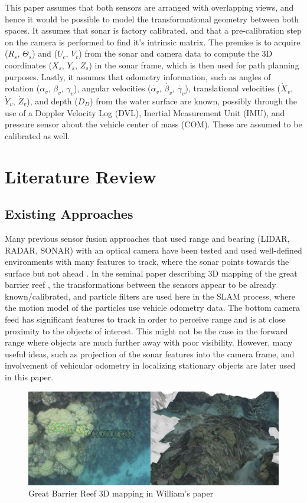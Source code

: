 \documentclass[15pt]{article}
\let\Theta\varTheta
\newcommand{\RSonar}{$\si{\textit{R}_{s}}$\xspace}
\newcommand{\ThetaSonar}{$\si{\Theta_{s}}$\xspace}
\newcommand{\UCamera}{$\si{\textit{U}_{c}}$\xspace}
\newcommand{\VCamera}{$\si{\textit{V}_{c}}$\xspace}
\newcommand{\XSonar}{$\si{\textit{X}_{s}}$\xspace}
\newcommand{\YSonar}{$\si{\textit{Y}_{s}}$\xspace}
\newcommand{\ZSonar}{$\si{\textit{Z}_{s}}$\xspace}
\newcommand{\Depth}{$D_{D}$\xspace}
\newcommand{\RollVehicle}{${\alpha_{v}}$\xspace}
\newcommand{\PitchVehicle}{${\beta_{v}}$\xspace}
\newcommand{\YawVehicle}{${\gamma_{v}}$\xspace}
\newcommand{\RollVehicleVelocity}{${\dot{\alpha_{v}}}$\xspace}
\newcommand{\PitchVehicleVelocity}{${\dot{\beta_{v}}}$\xspace}
\newcommand{\YawVehicleVelocity}{${\dot{\gamma_{v}}}$\xspace}
\newcommand{\XVehicleVelocity}{$\si{\dot{\textit{X}}_{v}}$\xspace}
\newcommand{\YVehicleVelocity}{$\si{\dot{\textit{Y}}_{v}}$\xspace}
\newcommand{\ZVehicleVelocity}{$\si{\dot{\textit{Z}}_{v}}$\xspace}
\begin{document}
This paper assumes that both sensors are arranged with overlapping views, and hence it would be possible to model the transformational geometry between both spaces. It assumes that sonar is factory calibrated, and that a pre-calibration step on the camera is performed to find it's intrinsic matrix. The premise is to acquire (\RSonar, \ThetaSonar) and (\UCamera, \VCamera) from the sonar and camera data to compute the 3D coordinates (\XSonar, \YSonar, \ZSonar) in the sonar frame, which is then used for path planning purposes. Lastly, it assumes that odometry information, such as angles of rotation (\RollVehicle, \PitchVehicle, \YawVehicle), angular velocities (\RollVehicleVelocity, \PitchVehicleVelocity, \YawVehicleVelocity), translational velocities (\XVehicleVelocity, \YVehicleVelocity, \ZVehicleVelocity), and depth (\Depth) from the water surface are known, possibly through the use of a Doppler Velocity Log (DVL), Inertial Measurement Unit (IMU), and pressure sensor about the vehicle center of mass (COM). These are assumed to be calibrated as well. 

\section{Literature Review}

\subsection{Existing Approaches}
Many previous sensor fusion approaches that used range and bearing (LIDAR, RADAR, SONAR) with an optical camera have been tested and used well-defined environments with many features to track, where the sonar points towards the surface but not ahead \cite{Williams2004} \cite{Xu2012}. In the seminal paper describing 3D mapping of the great barrier reef \cite{Williams2004}, the transformations between the sensors appear to be already known/calibrated, and particle filters are used here in the SLAM process, where the motion model of the particles use vehicle odometry data. The bottom camera feed has significant features to track in order to perceive range and is at close proximity to the objects of interest. This might not be the case in the forward range where objects are much further away with poor visibility. However, many useful ideas, such as projection of the sonar features into the camera frame, and involvement of vehicular odometry in localizing stationary objects are later used in this paper.

\begin{figure}[h!]
  \centering
  \includegraphics[scale=0.5]{reef}
  \captionsetup{justification=centering}
  \caption{Great Barrier Reef 3D mapping in William's paper}
\end{figure}
\end{document}
